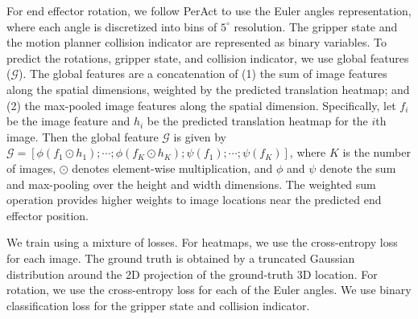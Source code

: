 For end effector rotation, we follow PerAct to use the Euler angles representation, where each angle is discretized into bins of $5^{\circ}$ resolution. The gripper state and the motion planner collision indicator are represented as binary variables. To predict the rotations, gripper state, and collision indicator, we use global features ($\mathcal{G}$). The global features are a concatenation of (1) the sum of image features along the spatial dimensions, weighted by the predicted translation heatmap; and (2) the max-pooled image features along the spatial dimension. Specifically, let $f_i$ be the image feature and $h_i$ be the predicted translation heatmap for the $i$th image. Then the global feature $\mathcal{G}$ is given by $\mathcal{G} = \left[ \phi(f_1 \odot h_1); \cdots ;\phi(f_K \odot h_K); \psi(f_1); \cdots; \psi(f_K) \right]$, where $K$ is the number of images, $\odot$ denotes element-wise multiplication, and $\phi$ and $\psi$ denote the sum and max-pooling over the height and width dimensions. The weighted sum operation provides higher weights to image locations near the predicted end effector position.


We train \method using a mixture of losses. For heatmaps, we use the cross-entropy loss for each image. The ground truth is obtained by a truncated Gaussian distribution around the 2D projection of the ground-truth 3D location. For rotation, we use the cross-entropy loss for each of the Euler angles. We use binary classification loss for the gripper state and collision indicator.